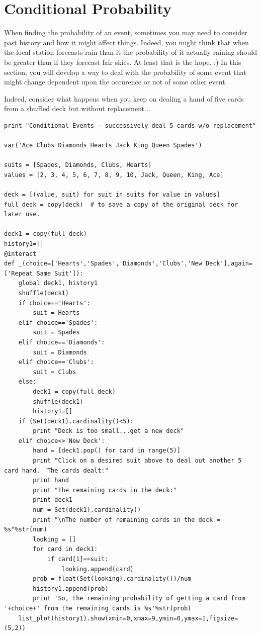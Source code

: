 \documentclass[10pt,]{book}
\theoremstyle{plain}
\theoremstyle{definition}
\theoremstyle{definition}
\theoremstyle{definition}
\numberwithin{equation}{section}
\begin{document}
\section[{Conditional Probability}]{Conditional Probability}\label{section-22}
\typeout{************************************************}
\typeout{************************************************}
When finding the probability of an event, sometimes you may need to consider past history and how it might affect things. Indeed, you might think that when the local station forecasts rain than it the probability of it actually raining should be greater than if they forecast fair skies. At least that is the hope. :)  In this section, you will develop a way to deal with the probability of some event that might change dependent upon the occurence or not of some other event.
\par
Indeed, consider what happens when you keep on dealing a hand of five cards from a shuffled deck but without replacement...%
\begin{lstlisting}[style=sageinput]
print "Conditional Events - successively deal 5 cards w/o replacement" 

var('Ace Clubs Diamonds Hearts Jack King Queen Spades') 

suits = [Spades, Diamonds, Clubs, Hearts] 
values = [2, 3, 4, 5, 6, 7, 8, 9, 10, Jack, Queen, King, Ace] 

deck = [(value, suit) for suit in suits for value in values]
full_deck = copy(deck)  # to save a copy of the original deck for later use.

deck1 = copy(full_deck)
history1=[]
@interact
def _(choice=['Hearts','Spades','Diamonds','Clubs','New Deck'],again=['Repeat Same Suit']):
    global deck1, history1
    shuffle(deck1)
    if choice=='Hearts':
        suit = Hearts
    elif choice=='Spades':
        suit = Spades
    elif choice=='Diamonds':
        suit = Diamonds
    elif choice=='Clubs':
        suit = Clubs
    else:
        deck1 = copy(full_deck)
        shuffle(deck1)
        history1=[]
    if (Set(deck1).cardinality()<5):
        print "Deck is too small...get a new deck"
    elif choice<>'New Deck':
        hand = [deck1.pop() for card in range(5)] 
        print "Click on a desired suit above to deal out another 5 card hand.  The cards dealt:"
        print hand
        print "The remaining cards in the deck:"
        print deck1
        num = Set(deck1).cardinality()
        print "\nThe number of remaining cards in the deck = %s"%str(num)
        looking = []
        for card in deck1:
            if card[1]==suit:
                looking.append(card)
        prob = float(Set(looking).cardinality())/num
        history1.append(prob)
        print 'So, the remaining probability of getting a card from '+choice+' from the remaining cards is %s'%str(prob)
    list_plot(history1).show(xmin=0,xmax=9,ymin=0,ymax=1,figsize=(5,2))
\end{lstlisting}
\end{document}
